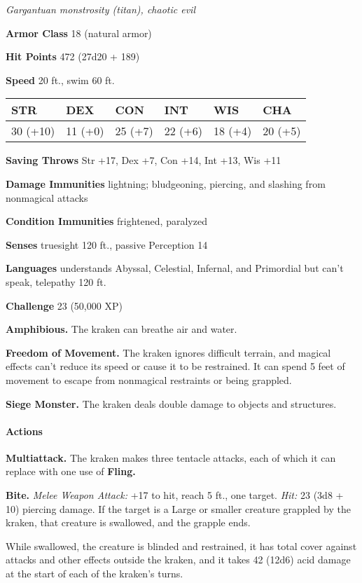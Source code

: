 \documentclass[
]{article}
\begin{document}
\emph{Gargantuan monstrosity (titan), chaotic evil}

\textbf{Armor Class} 18 (natural armor)

\textbf{Hit Points} 472 (27d20 + 189)

\textbf{Speed} 20 ft., swim 60 ft.

\begin{longtable}[]{@{}llllll@{}}
\toprule
STR & DEX & CON & INT & WIS & CHA\tabularnewline
\midrule
\endhead
30 (+10) & 11 (+0) & 25 (+7) & 22 (+6) & 18 (+4) & 20
(+5)\tabularnewline
\bottomrule
\end{longtable}

\textbf{Saving Throws} Str +17, Dex +7, Con +14, Int +13, Wis +11

\textbf{Damage Immunities} lightning; bludgeoning, piercing, and
slashing from nonmagical attacks

\textbf{Condition Immunities} frightened, paralyzed

\textbf{Senses} truesight 120 ft., passive Perception 14

\textbf{Languages} understands Abyssal, Celestial, Infernal, and
Primordial but can't speak, telepathy 120 ft.

\textbf{Challenge} 23 (50,000 XP)

\textbf{Amphibious.} The kraken can breathe air and water.

\textbf{Freedom of Movement.} The kraken ignores difficult terrain, and
magical effects can't reduce its speed or cause it to be restrained. It
can spend 5 feet of movement to escape from nonmagical restraints or
being grappled.

\textbf{Siege Monster.} The kraken deals double damage to objects and
structures.

\hypertarget{actions-1}{%
\paragraph{Actions}\label{actions-1}}

\textbf{Multiattack.} The kraken makes three tentacle attacks, each of
which it can replace with one use of \textbf{Fling.}

\textbf{Bite.} \emph{Melee Weapon Attack:} +17 to hit, reach 5 ft., one
target. \emph{Hit:} 23 (3d8 + 10) piercing damage. If the target is a
Large or smaller creature grappled by the kraken, that creature is
swallowed, and the grapple ends.

While swallowed, the creature is blinded and restrained, it has total
cover against attacks and other effects outside the kraken, and it takes
42 (12d6) acid damage at the start of each of the kraken's turns.
\end{document}
